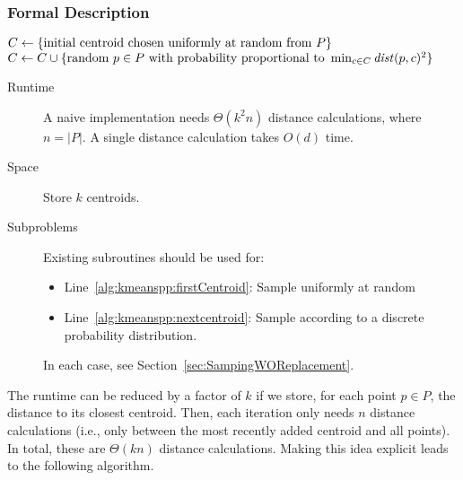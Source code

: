 \subsubsection{Formal Description}

\begin{algorithm} \label{alg:kmeans++}
\begin{algorithmic}[1]
	\State $C \leftarrow \{ \text{initial centroid chosen uniformly at random from } P \}$ \label{alg:kmeanspp:firstCentroid}
	 \label{alg:kmeans++:for}
		\State $C \leftarrow C \cup \{ \text{random $p \in P$ with probability proportional to }\min_{c \in C} \mathit{dist}(p,c)^2 \}$ \label{alg:kmeanspp:nextcentroid}
	\EndFor
\end{algorithmic}
\end{algorithm}

\begin{description}
	\item[Runtime] A naive implementation needs $\Theta(k^2 n)$ distance calculations, where $n = |P|$. A single distance calculation takes $O(d)$ time.
	\item[Space] Store $k$ centroids.
	\item[Subproblems]
		Existing subroutines should be used for:
		\begin{itemize}
			\item Line~\ref{alg:kmeanspp:firstCentroid}: Sample uniformly at random
			\item Line~\ref{alg:kmeanspp:nextcentroid}: Sample according to a discrete probability distribution.
		\end{itemize}
		In each case, see Section~\ref{sec:SampingWOReplacement}.
\end{description}

The runtime can be reduced by a factor of $k$ if we store, for each point $p \in P$, the distance to its closest centroid. Then, each iteration only needs $n$ distance calculations (i.e., only between the most recently added centroid and all points). In total, these are $\Theta(k n)$ distance calculations. Making this idea explicit leads to the following algorithm.

